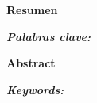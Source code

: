 \documentclass[11pt,a4paper]{book}
\begin{document}
 

\thispagestyle{empty}
\clearpage
\setcounter{page}{1}


\newpage
\begin{center}
   {\bf Resumen} 
\end{center}
   

\vspace{0.6 cm}
\textsl{\textbf{Palabras clave:} } 



\begin{center}
   {\bf Abstract} 
\end{center}



\vspace{0.6 cm}
\textsl{\textbf{Keywords:} } 


\newpage
\tableofcontents

\newpage
\clearpage
{}










\end{document}
